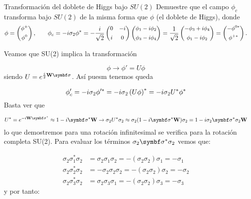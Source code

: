 \begin{Ejercicio}{Transformación del doblete de Higgs bajo $SU(2)$}\label{Ej:15}
Demuestre que el campo $\phi_c$ transforma bajo $SU(2)$ de la misma forma que $\phi$ (el doblete de Higgs), donde
\[ \small
\phi =
\begin{pmatrix}
\phi^+ \\[4pt]
\phi^0
\end{pmatrix},
\qquad
\phi_c = -i\sigma_2 \phi^\ast
= -\frac{i}{\sqrt{2}}
\begin{pmatrix}
0 & -i\\[4pt]
i & 0
\end{pmatrix}
\begin{pmatrix}
\phi_1 - i\phi_2\\[4pt]
\phi_3 - i\phi_4
\end{pmatrix}
=
\frac{1}{\sqrt{2}}
\begin{pmatrix}
-\phi_3 + i\phi_4\\[4pt]
\phi_1 - i\phi_2
\end{pmatrix}
=
\begin{pmatrix}
-\phi^{0\ast}\\[4pt]
\phi^{+\ast}
\end{pmatrix}.
\]
\end{Ejercicio}

Veamos que SU(2) implica la transformación 


\begin{equation}
	\phi \to \phi' = U \phi
\end{equation}
siendo $U=e^{\frac{i}{2}\Wn \sigman }$. Así puesm tenemos queda

\begin{equation}
	\phi_c' = - i \sigma_2 \phi^{\prime *} = - i  \sigma_2 \left( U \phi \right)^* = - i \sigma_2 U^* \phi^*
\end{equation}
Basta ver que 

\begin{equation}
	U^* = e^{-i\Wn \sigman^*}\approx 1 - i \sigman^* \Wn  \to \sigma_2 U^* \sigma_2 \approx \sigma_2 (1- i \sigman^* \Wn ) \sigma_2 = 1 - i  \sigma_2 \sigman^* \sigma_2 \Wn
\end{equation}
lo que demostremos para una rotación infinitesimal se verifica para la rotación completa SU(2). Para evaluar los términos $\sigma_2 \sigman^* \sigma_2$ vemos que:

\begin{align}
	\sigma_2 \sigma_1^* \sigma_2 & =  \sigma_2 \sigma_1 \sigma_2  = -  (\sigma_2\sigma_2)\sigma_1 = - \sigma_1 \\
	\sigma_2 \sigma_2^* \sigma_2 & = - \sigma_2 \sigma_2 \sigma_2  = -  (\sigma_2\sigma_2)\sigma_2 = - \sigma_2 \\
	\sigma_2 \sigma_3^* \sigma_2 & =  \sigma_2 \sigma_3 \sigma_1 = - (\sigma_2\sigma_2)\sigma_3 = -\sigma_3
\end{align}
y por tanto: 

